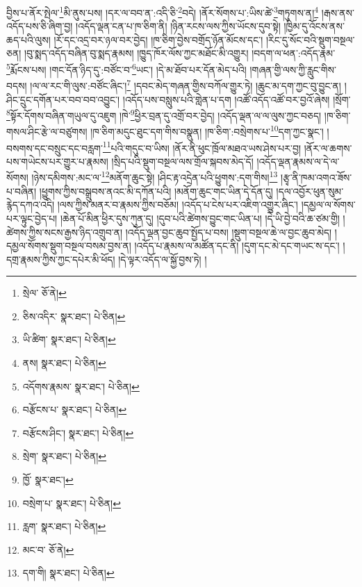 བྱིས་པ་ནོར་སྤེལ་\footnote{སྲེལ་  ཅོ་ནེ། }མི་ནུས་པས། །དར་ལ་བབ་ན་:འདི་ཅི་\footnote{ཅིས་འདིར་  སྣར་ཐང་།  པེ་ཅིན། }བདེ། །ནོར་སོགས་པ་:ཡིས་ཚེ་\footnote{ཡི་ཚིག་  སྣར་ཐང་།  པེ་ཅིན། }གཏུགས་ན།\footnote{ནས།  སྣར་ཐང་།  པེ་ཅིན། } །རྒས་ནས་འདོད་པས་ཅི་ཞིག་བྱ། །འདོད་ལྡན་ངན་པ་ཁ་ཅིག་ནི། །ཉིན་རངས་ལས་ཀྱིས་ཡོངས་དུབ་སྟེ། །ཁྱིམ་དུ་འོངས་ནས་ཆད་པའི་ལུས། །རོ་དང་འདྲ་བར་ཉལ་བར་བྱེད། །ཁ་ཅིག་བྱེས་བགྲོད་ཉོན་མོངས་དང་། །རིང་དུ་སོང་བའི་སྡུག་བསྔལ་ཅན། །བུ་སྨད་འདོད་བཞིན་བུ་སྨད་རྣམས། །ཁྱུད་ཁོར་ལོས་ཀྱང་མཐོང་མི་འགྱུར། །བདག་ལ་ཕན་:འདོད་རྣམ་\footnote{འདོགས་རྣམས་  སྣར་ཐང་།  པེ་ཅིན། }རྨོངས་པས། །གང་དོན་ཉིད་དུ་:བཙོང་བ་\footnote{བརྩོངས་པ་  སྣར་ཐང་།  པེ་ཅིན། }ཡང་། །དེ་མ་ཐོབ་པར་དོན་མེད་པའི། །གཞན་གྱི་ལས་ཀྱི་རླུང་གིས་བདས། །ལ་ལ་རང་གི་ལུས་:བཙོང་ཞིང་།\footnote{བརྩོངས་ཤིང་།  སྣར་ཐང་།  པེ་ཅིན། } །དབང་མེད་གཞན་གྱིས་བཀོལ་གྱུར་ཏེ། །ཆུང་མ་དག་ཀྱང་བུ་བྱུང་ན། །ཤིང་དྲུང་དགོན་པར་བབ་བབ་འབྱུང་། །འདོད་པས་བསླུས་པའི་གླེན་པ་དག །འཚོ་འདོད་འཚོ་བར་བྱའོ་ཞེས། །སྲོག་\footnote{སྲེག་  སྣར་ཐང་།  པེ་ཅིན། }སྟོར་དོགས་བཞིན་གཡུལ་དུ་འཇུག །ཁེ་\footnote{ཁྱོ་  སྣར་ཐང་། }ཕྱིར་བྲན་དུ་འགྲོ་བར་བྱེད། །འདོད་ལྡན་ལ་ལ་ལུས་ཀྱང་བཅད། །ཁ་ཅིག་གསལ་ཤིང་རྩེ་ལ་བཙུགས། །ཁ་ཅིག་མདུང་ཐུང་དག་གིས་བསྣུན། །ཁ་ཅིག་:བསྲེགས་པ་\footnote{བསྲེག་པ་  སྣར་ཐང་།  པེ་ཅིན། }དག་ཀྱང་སྣང་། །བསགས་དང་བསྲུང་དང་བརླག་\footnote{རླག་  སྣར་ཐང་།  པེ་ཅིན། }པའི་གདུང་བ་ཡིས། །ནོར་ནི་ཕུང་ཁྲོལ་མཐའ་ཡས་ཤེས་པར་བྱ། །ནོར་ལ་ཆགས་པས་གཡེངས་པར་གྱུར་པ་རྣམས། །སྲིད་པའི་སྡུག་བསྔལ་ལས་གྲོལ་སྐབས་མེད་དོ། །འདོད་ལྡན་རྣམས་ལ་དེ་ལ་སོགས། །ཉེས་དམིགས་:མང་ལ་\footnote{མང་བ་  ཅོ་ནེ། }མནོག་ཆུང་སྟེ། །ཤིང་རྟ་འདྲེན་པའི་ཕྱུགས་:དག་གིས།\footnote{དག་གི།  སྣར་ཐང་།  པེ་ཅིན། } །རྩྭ་ནི་ཁམ་འགའ་ཟོས་པ་བཞིན། །ཕྱུགས་ཀྱིས་བསྒྲུབས་ནའང་མི་དཀོན་པའི། །མནོག་ཆུང་གང་ཡིན་དེ་དོན་དུ། །དལ་འབྱོར་ཕུན་སུམ་རྙེད་དཀའ་འདི། །ལས་ཀྱིས་མནར་བ་རྣམས་ཀྱིས་བཅོམ། །འདོད་པ་ངེས་པར་འཇིག་འགྱུར་ཞིང་། །དམྱལ་ལ་སོགས་པར་ལྟུང་བྱེད་པ། །ཆེན་པོ་མིན་ཕྱིར་དུས་ཀུན་དུ། །དུབ་པའི་ཚེགས་བྱུང་གང་ཡིན་པ། །དེ་ཡི་བྱེ་བའི་ཆ་ཙམ་གྱི། །ཚེགས་ཀྱིས་སངས་རྒྱས་ཉིད་འགྲུབ་ན། །འདོད་ལྡན་བྱང་ཆུབ་སྤྱོད་པ་བས། །སྡུག་བསྔལ་ཆེ་ལ་བྱང་ཆུབ་མེད། །དམྱལ་སོགས་སྡུག་བསྔལ་བསམ་བྱས་ན། །འདོད་པ་རྣམས་ལ་མཚོན་དང་ནི། །དུག་དང་མེ་དང་གཡང་ས་དང་། །དགྲ་རྣམས་ཀྱིས་ཀྱང་དཔེར་མི་ཕོད། །དེ་ལྟར་འདོད་ལ་སྐྱོ་བྱས་ཏེ། །

